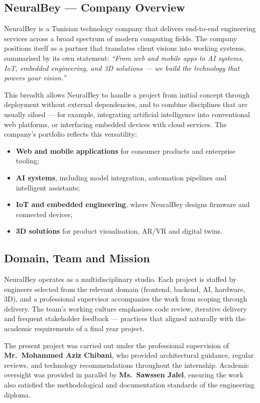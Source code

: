\documentclass[12pt, a4paper, oneside]{report}
\begin{document}
\subsection{NeuralBey --- Company Overview}

NeuralBey is a Tunisian technology company that delivers end-to-end
engineering services across a broad spectrum of modern computing fields.
The company positions itself as a partner that translates client visions
into working systems, summarised by its own statement: \textit{``From web
and mobile apps to AI systems, IoT, embedded engineering, and 3D
solutions --- we build the technology that powers your vision.''}

This breadth allows NeuralBey to handle a project from initial concept
through deployment without external dependencies, and to combine
disciplines that are usually siloed --- for example, integrating
artificial intelligence into conventional web platforms, or interfacing
embedded devices with cloud services. The company's portfolio reflects
this versatility:

\begin{itemize}[leftmargin=*,itemsep=2pt]
  \item \textbf{Web and mobile applications} for consumer products and
        enterprise tooling;
  \item \textbf{AI systems}, including model integration, automation
        pipelines and intelligent assistants;
  \item \textbf{IoT and embedded engineering}, where NeuralBey designs
        firmware and connected devices;
  \item \textbf{3D solutions} for product visualisation, AR/VR and
        digital twins.
\end{itemize}

\subsection{Domain, Team and Mission}

NeuralBey operates as a multidisciplinary studio. Each project is
staffed by engineers selected from the relevant domain (frontend,
backend, AI, hardware, 3D), and a professional supervisor accompanies
the work from scoping through delivery. The team's working culture
emphasises code review, iterative delivery and frequent stakeholder
feedback --- practices that aligned naturally with the academic
requirements of a final year project.

The present project was carried out under the professional supervision
of \textbf{Mr.\ Mohammed Aziz Chibani}, who provided architectural
guidance, regular reviews, and technology recommendations throughout
the internship. Academic oversight was provided in parallel by
\textbf{Ms.\ Sawssen Jalel}, ensuring the work also satisfied the
methodological and documentation standards of the engineering diploma.
\end{document}
